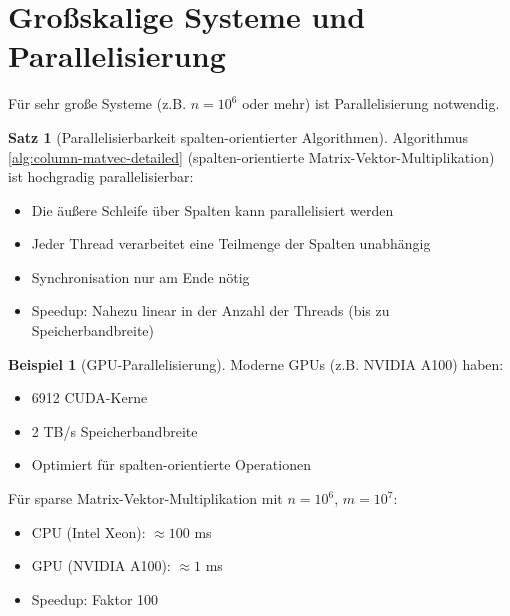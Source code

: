 ﻿\documentclass[a4paper,12pt]{report}
\theoremstyle{definition}
\newtheorem{beispiel}{Beispiel}
\newtheorem{satz}{Satz}
\begin{document}
	\section{Großskalige Systeme und Parallelisierung}
	
	Für sehr große Systeme (z.B. $n = 10^6$ oder mehr) ist Parallelisierung notwendig.
	
	\begin{satz}[Parallelisierbarkeit spalten-orientierter Algorithmen]
		Algorithmus \ref{alg:column-matvec-detailed} (spalten-orientierte Matrix-Vektor-Multiplikation) ist hochgradig parallelisierbar:
		
		\begin{itemize}
			\item Die äußere Schleife über Spalten kann parallelisiert werden
			\item Jeder Thread verarbeitet eine Teilmenge der Spalten unabhängig
			\item Synchronisation nur am Ende nötig
			\item Speedup: Nahezu linear in der Anzahl der Threads (bis zu Speicherbandbreite)
		\end{itemize}
	\end{satz}
	
	\begin{beispiel}[GPU-Parallelisierung]
		Moderne GPUs (z.B. NVIDIA A100) haben:
		\begin{itemize}
			\item 6912 CUDA-Kerne
			\item 2 TB/s Speicherbandbreite
			\item Optimiert für spalten-orientierte Operationen
		\end{itemize}
		
		Für sparse Matrix-Vektor-Multiplikation mit $n = 10^6$, $m = 10^7$:
		\begin{itemize}
			\item CPU (Intel Xeon): $\approx 100$ ms
			\item GPU (NVIDIA A100): $\approx 1$ ms
			\item Speedup: Faktor 100
		\end{itemize}
	\end{beispiel}
	
\end{document}
